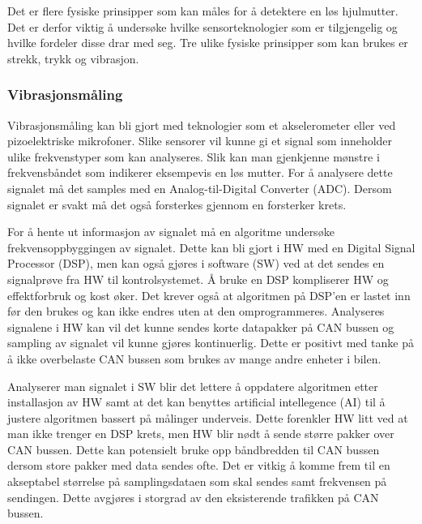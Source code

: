 Det er flere fysiske prinsipper som kan måles for å detektere en løs hjulmutter.
Det er derfor viktig å undersøke hvilke sensorteknologier som er tilgjengelig og
hvilke fordeler disse drar med seg. Tre ulike fysiske prinsipper som kan brukes er strekk, trykk og vibrasjon. 

\subsubsection{Vibrasjonsmåling}

Vibrasjonsmåling kan bli gjort med teknologier som et akselerometer eller ved
pizoelektriske mikrofoner. Slike sensorer vil kunne gi et signal som inneholder
ulike frekvenstyper som kan analyseres. Slik kan man gjenkjenne mønstre i
frekvensbåndet som indikerer eksempevis en løs mutter. For å analysere dette signalet må det
samples med en Analog-til-Digital Converter (ADC). Dersom signalet er svakt må det også forsterkes gjennom en
forsterker krets. 

For å hente ut informasjon av signalet må en algoritme undersøke
frekvensoppbyggingen av signalet. Dette kan bli gjort i HW med en Digital Signal Processor (DSP), men kan
også gjøres i software (SW) ved at det sendes en signalprøve fra HW til kontrolsystemet. Å
bruke en DSP kompliserer HW og effektforbruk og kost øker. Det krever også at algoritmen på DSP'en 
er lastet inn før den brukes og kan ikke endres uten at den omprogrammeres. Analyseres signalene i HW kan vil
det kunne sendes korte datapakker på CAN bussen og sampling av signalet vil kunne gjøres kontinuerlig. Dette er
positivt med tanke på å ikke overbelaste CAN bussen som brukes av mange andre enheter i bilen. 

Analyserer man signalet i SW blir det lettere å oppdatere algoritmen etter installasjon av HW
samt at det kan benyttes artificial intellegence (AI) til å justere algoritmen bassert på målinger underveis. 
Dette forenkler HW litt ved at man ikke trenger en DSP krets, men HW blir nødt å sende større pakker over CAN
bussen. Dette kan potensielt bruke opp båndbredden til CAN bussen dersom store pakker med data sendes ofte. 
Det er vitkig å komme frem til en akseptabel størrelse på samplingsdataen som skal sendes samt frekvensen på
sendingen. Dette avgjøres i storgrad av den eksisterende trafikken på CAN bussen.

%

